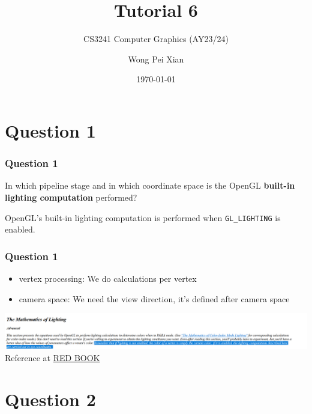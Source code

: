 \documentclass{beamer}
\title{Tutorial 6}
\subtitle{CS3241 Computer Graphics (AY23/24)}
\date{\today}
\author{Wong Pei Xian}
\institute[]{\email{e0389023@u.nus.edu}}
\begin{document}
\frame[plain]{\titlepage}

\section{Question 1}

\begin{frame}
    \frametitle{Question 1}


    In which pipeline stage and in which coordinate space is the OpenGL 
    \textbf{built-in lighting computation} performed? 

    \begin{tcolorbox}
        OpenGL's built-in lighting computation is performed when
        \texttt{GL\_LIGHTING} is enabled.
    \end{tcolorbox}
\end{frame}

\begin{frame}
    \frametitle{Question 1}

    \begin{itemize}
        \item vertex processing: We do calculations per vertex 
        \item camera space: We need the view direction, it's defined after camera space
    \end{itemize}
    
    \begin{center}
        \includegraphics[scale=0.3]{q1.png}
        \small
        Reference at \hyperlink{https://www.glprogramming.com/red/chapter05.html}{RED BOOK}
    \end{center}

\end{frame}

\section{Question 2}
\end{document}
